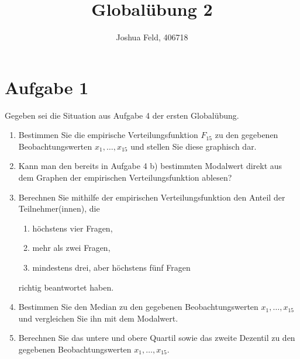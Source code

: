 \documentclass{exercise}
\institute{Institut für Statistik und Wirtschaftsmathematik}
\title{Globalübung 2}
\author{Joshua Feld, 406718}
\begin{document}
    \maketitle


    \section*{Aufgabe 1}

    \begin{problem}
        Gegeben sei die Situation aus Aufgabe 4 der ersten Globalübung.
        \begin{enumerate}
            \item Bestimmen Sie die empirische Verteilungsfunktion \(F_{15}\) zu den gegebenen Beobachtungswerten \(x_1, \ldots, x_{15}\) und stellen Sie diese graphisch dar.
            \item Kann man den bereits in Aufgabe 4 b) bestimmten Modalwert direkt aus dem Graphen der empirischen Verteilungsfunktion ablesen?
            \item Berechnen Sie mithilfe der empirischen Verteilungsfunktion den Anteil der Teilnehmer(innen), die
            \begin{enumerate}
                \item höchstens vier Fragen,
                \item mehr als zwei Fragen,
                \item mindestens drei, aber höchstens fünf Fragen
            \end{enumerate}
            richtig beantwortet haben.
            \item Bestimmen Sie den Median zu den gegebenen Beobachtungswerten \(x_1, \ldots, x_{15}\) und vergleichen Sie ihn mit dem Modalwert.
            \item Berechnen Sie das untere und obere Quartil sowie das zweite Dezentil zu den gegebenen Beobachtungswerten \(x_1, \ldots, x_{15}\).
        \end{enumerate}
    \end{problem}
\end{document}
